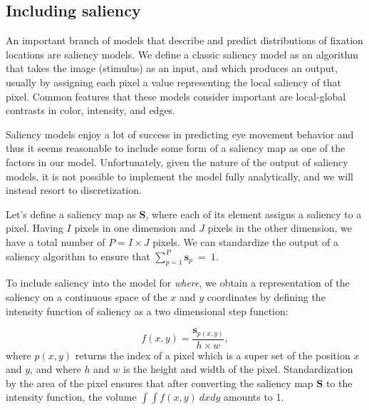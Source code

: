 \documentclass{article}
\begin{document}



\subsection{Including saliency}

An important branch of models that describe and predict distributions of fixation locations are saliency models. We define a classic saliency model as an algorithm that takes the image (stimulus) as an input, and which produces an output, usually by assigning each pixel a value representing the local saliency of that pixel. Common features that these models consider important are local-global contrasts in color, intensity, and edges.

Saliency models enjoy a lot of success in predicting eye movement behavior and thus it seems reasonable to include some form of a saliency map as one of the factors in our model. Unfortunately, given the nature of the output of saliency models, it is not possible to implement the model fully analytically, and we will instead resort to discretization.

Let's define a saliency map as $\mathbf{S}$, where each of its element assigns a saliency to a pixel. Having $I$ pixels in one dimension and $J$ pixels in the other dimension, we have a total number of $P = I \times J$ pixels. We can standardize the output of a saliency algorithm to ensure that $\sum_{p=1}^{P} \mathbf{s}_{p}~=~1$.

To include saliency into the model for \textit{where}, we obtain a representation of the saliency on a continuous space of the $x$ and $y$ coordinates by defining the intensity function of saliency as a two dimensional step function: 

\begin{equation}
\label{eq:saliency_where}
    f(x, y) = \frac{\mathbf{s}_{p(x,y)} }{h \times w},
\end{equation}
where $p(x, y)$ returns the index of a pixel which is a super set of the position $x$ and $y$, and where $h$ and $w$ is the height and width of the pixel. Standardization by the area of the pixel ensures that after converting the saliency map $\mathbf{S}$ to the intensity function, the volume $\int \int f(x, y)~dxdy$ amounts to 1.
\end{document}

